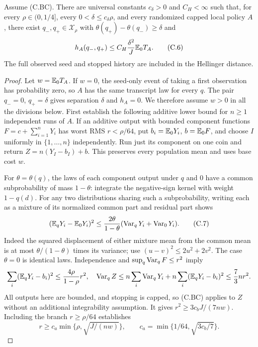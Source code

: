 \begin{lemma}\label{crit:lem:hard-pair}
Assume (C.BC). There are universal constants $c_\delta>0$ and $C_H<\infty$
such that, for every $\rho\in(0,1/4]$, every
$0<\delta\le c_\delta\rho$, and every randomized capped local policy $A$,
there exist $q_-,q_+\in\mathcal X_\rho$ with
$\theta(q_+)-\theta(q_-)\ge\delta$ and
\[
 h_A(q_-,q_+)\le C_H\frac{\delta^2}{J}\mathbb E_0T_A.              \tag{C.6}
\]
The full observed seed and stopped history are included in the Hellinger
distance.
\end{lemma}
\begin{proof}
Let $w=\mathbb E_0T_A$. If $w=0$, the seed-only event of taking a first observation
has probability zero, so $A$ has the same transcript law for every $q$.
The pair $q_-=0$, $q_+=\delta$ gives separation $\delta$ and $h_A=0$.
We therefore assume $w>0$ in all the divisions below.
First establish the following additive lower bound for
$n\ge1$ independent runs of $A$. If an additive output with bounded
component functions
$F=c+\sum_{i=1}^nY_i$ has worst RMS $r<\rho/64$, put
$b_i=\mathbb E_0Y_i$, $b=\mathbb E_0F$, and choose $I$ uniformly in $\{1,\ldots,n\}$
independently. Run just its component on one coin and return
$Z=n(Y_I-b_I)+b$. This preserves every population mean and uses base cost
$w$.

For $\theta=\theta(q)$, the laws of each component output under $q$ and
$0$ have a common subprobability of mass $1-\theta$: integrate the
negative-sign kernel with weight $1-q(d)$. For any two distributions
sharing such a subprobability, writing each as a mixture of its normalized
common part and residual part shows
\[
 (\mathbb E_qY_i-\mathbb E_0Y_i)^2
 \le\frac{2\theta}{1-\theta}
       (\operatorname{Var}_qY_i+\operatorname{Var}_0Y_i).                              \tag{C.7}
\]
Indeed the squared displacement of either mixture mean from the common
mean is at most $\theta/(1-\theta)$ times its variance; use
$(u-v)^2\le2u^2+2v^2$. The case $\theta=0$ is identical laws.
Independence and $\sup_q\operatorname{Var}_qF\le r^2$ imply
\[
 \sum_i(\mathbb E_qY_i-b_i)^2\le\frac{4\rho}{1-\rho}r^2,
 \quad
 \operatorname{Var}_qZ\le n\sum_i\operatorname{Var}_qY_i
                 +n\sum_i(\mathbb E_qY_i-b_i)^2
              \le\frac73nr^2.
\]
All outputs here are bounded, and stopping is capped, so (C.BC) applies to
$Z$ without an additional integrability assumption. It gives
$r^2\ge3c_bJ/(7nw)$. Including the branch $r\ge\rho/64$ establishes
\[
 r\ge c_a\min\{\rho,\sqrt{J/(nw)}\},\qquad
 c_a=\min\{1/64,\sqrt{3c_b/7}\}.                           \tag{C.8}
\]


\end{proof}
